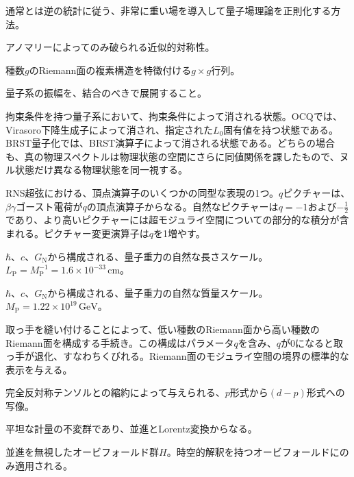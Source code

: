 {通常とは逆の統計に従う、非常に重い場を導入して量子場理論を正則化する方法。}

{アノマリーによってのみ破られる近似的対称性。}

{種数$g$のRiemann面の複素構造を特徴付ける$g\times g$行列。}

{量子系の振幅を、結合のべきで展開すること。}

{拘束条件を持つ量子系において、拘束条件によって消される状態。OCQでは、Virasoro下降生成子によって消され、指定された$L_0$固有値を持つ状態である。BRST量子化では、BRST演算子によって消される状態である。どちらの場合も、真の物理スペクトルは物理状態の空間にさらに同値関係を課したもので、ヌル状態だけ異なる物理状態を同一視する。}

{RNS超弦における、頂点演算子のいくつかの同型な表現の1つ。$q$ピクチャーは、$\beta\gamma$ゴースト電荷が$q$の頂点演算子からなる。自然なピクチャーは$q=-1$および$-\frac12$であり、より高いピクチャーには超モジュライ空間についての部分的な積分が含まれる。ピクチャー変更演算子は$q$を1増やす。}

{$\hbar$、$c$、$G_{\mathrm N}$から構成される、量子重力の自然な長さスケール。
$L_{\mathrm P}=M_{\mathrm P}^{-1}=1.6\times10^{-33}\,\mathrm{cm}$。}

{$\hbar$、$c$、$G_{\mathrm N}$から構成される、量子重力の自然な質量スケール。
$M_{\mathrm P}=1.22\times10^{19}\,\mathrm{GeV}$。}

{取っ手を縫い付けることによって、低い種数のRiemann面から高い種数のRiemann面を構成する手続き。この構成はパラメータ$q$を含み、$q$が0になると取っ手が退化、すなわちくびれる。Riemann面のモジュライ空間の境界の標準的な表示を与える。}

{完全反対称テンソルとの縮約によって与えられる、$p$形式から$(d-p)$形式への写像。}

{平坦な計量の不変群であり、並進とLorentz変換からなる。}

{並進を無視したオービフォールド群$H$。時空的解釈を持つオービフォールドにのみ適用される。}

